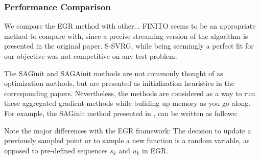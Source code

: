 \documentclass[11pt]{article}
\begin{document}
   
   \subsubsection{Performance Comparison}   
    
   We compare the EGR method with other... FINITO seems to be an appropriate method to compare with, since a precise streaming version of the algorithm is presented in the original paper. S-SVRG, while being seemingly a perfect fit for our objective was not competitive on any test problem. 
   
   The SAGinit and SAGAinit methods are not commonly thought of as optimization methods, but are presented as initialization heuristics in the corresponding papers. Nevertheless, the methods are considered as a way to run these aggregated gradient methods while buliding up memory as you go along. For example, the SAGinit method presented in \cite{roux2012stochastic}, can be written as follows:
   
   Note the major differences with the EGR framework: The decision to update a previously sampled point or to sample a new function is a random variable, as opposed to pre-defined sequences $s_k$ and $u_k$ in EGR. 
\end{document}
